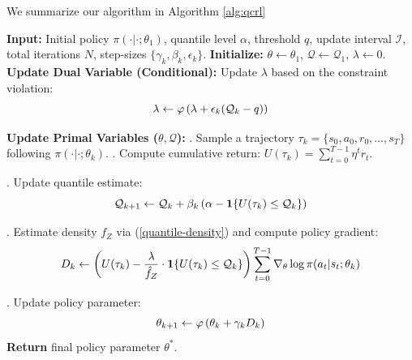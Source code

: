 We summarize our algorithm in Algorithm \ref{alg:qcrl}
\begin{algorithm}[ht]
\caption{Quantile-Constrained Policy Optimization}
\label{alg:qcrl}
\begin{algorithmic}[1]
\STATE \textbf{Input:} Initial policy $\pi(\cdot|\cdot;\theta_1)$, quantile level $\alpha$, threshold $q$, update interval $\mathcal{I}$, total iterations $N$, step-sizes $\{\gamma_k, \beta_k, \epsilon_k\}$.
\STATE \textbf{Initialize:} $\theta \gets \theta_1$, $\mathcal{Q} \gets \mathcal{Q}_1$, $\lambda \gets 0$.
    \STATE \textbf{Update Dual Variable (Conditional):}
        \STATE Update $\lambda$ based on the constraint violation:
        \begin{equation}
            \lambda \gets \varphi\left(\lambda + \epsilon_k(\mathcal{Q}_k-q)\right) \notag
        \end{equation}
    \ENDIF
    
    \STATE \textbf{Update Primal Variables ($\theta, \mathcal{Q}$):}
    . Sample a trajectory $\tau_k = \{s_0, a_0, r_0, \dots, s_T\}$ following $\pi(\cdot|\cdot;\theta_k)$.
    . Compute cumulative return: $U(\tau_k) = \sum_{t=0}^{T-1} \eta^t r_t$.
    
    . Update quantile estimate:
    \begin{equation}
        \mathcal{Q}_{k+1} \gets \mathcal{Q}_k + \beta_k \left( \alpha - \mathbf{1}\{ U(\tau_k) \leq \mathcal{Q}_k \} \right) \notag
    \end{equation}
    
    . Estimate density $f_Z$ via (\ref{quantile-density}) and compute policy gradient:
    \begin{equation}
        D_k \gets \left( U(\tau_k) - \frac{\lambda}{\hat{f}_Z} \cdot \mathbf{1}\{ U(\tau_k) \leq \mathcal{Q}_k \} \right) \sum_{t=0}^{T-1} \nabla_\theta \log \pi(a_t | s_t; \theta_k) \notag
    \end{equation}
    
    . Update policy parameter:
    \begin{equation}
        \theta_{k+1} \gets \varphi\left(\theta_k + \gamma_k D_k\right) \notag
    \end{equation}
\ENDFOR
\STATE \textbf{Return} final policy parameter $\theta^*$.
\end{algorithmic}
\end{algorithm}
